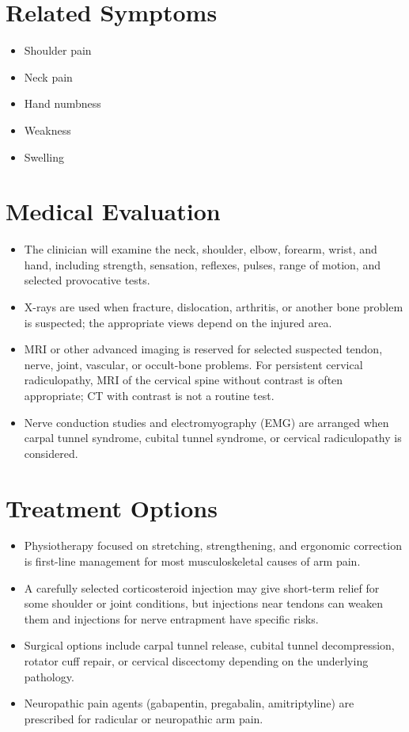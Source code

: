 \section*{Related Symptoms}
\begin{itemize}
 \item Shoulder pain
 \item Neck pain
 \item Hand numbness
 \item Weakness
 \item Swelling
\end{itemize}


\section*{Medical Evaluation}
\begin{itemize}
 \item The clinician will examine the neck, shoulder, elbow, forearm, wrist, and hand, including strength, sensation, reflexes, pulses, range of motion, and selected provocative tests.
 \item X-rays are used when fracture, dislocation, arthritis, or another bone problem is suspected; the appropriate views depend on the injured area.
 \item MRI or other advanced imaging is reserved for selected suspected tendon, nerve, joint, vascular, or occult-bone problems. For persistent cervical radiculopathy, MRI of the cervical spine without contrast is often appropriate; CT with contrast is not a routine test.
 \item Nerve conduction studies and electromyography (EMG) are arranged when carpal tunnel syndrome, cubital tunnel syndrome, or cervical radiculopathy is considered.
\end{itemize}

\section*{Treatment Options}
\begin{itemize}
 \item Physiotherapy focused on stretching, strengthening, and ergonomic correction is first-line management for most musculoskeletal causes of arm pain.
 \item A carefully selected corticosteroid injection may give short-term relief for some shoulder or joint conditions, but injections near tendons can weaken them and injections for nerve entrapment have specific risks.
 \item Surgical options include carpal tunnel release, cubital tunnel decompression, rotator cuff repair, or cervical discectomy depending on the underlying pathology.
 \item Neuropathic pain agents (gabapentin, pregabalin, amitriptyline) are prescribed for radicular or neuropathic arm pain.
\end{itemize}

